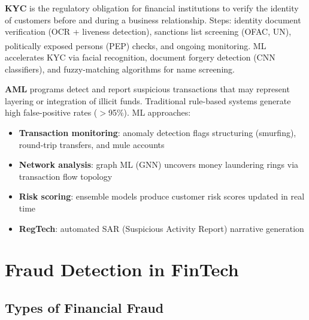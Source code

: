 \begin{tcbitemize}[ skin=sectionraster ]

    \tcbitem[title=Know Your Customer (KYC), raster multicolumn=3]
    \textbf{KYC} is the regulatory obligation for financial institutions to verify the identity of customers before and during a business relationship.
    Steps: identity document verification (OCR + liveness detection), sanctions list screening (OFAC, UN), politically exposed persons (PEP) checks, and ongoing monitoring\textsuperscript{\cite[][pp.~378--379]{kardellBuildFinancialSoftware2025}}.
    ML accelerates KYC via facial recognition, document forgery detection (CNN classifiers), and fuzzy-matching algorithms for name screening.

    \tcbitem[title=Anti-Money Laundering (AML), raster multicolumn=3]
    \textbf{AML} programs detect and report suspicious transactions that may represent layering or integration of illicit funds.
    Traditional rule-based systems generate high false-positive rates ($>$95\%).
    ML approaches:
    \tcblower
    \begin{itemize}
        \item \textbf{Transaction monitoring}: anomaly detection flags structuring (smurfing), round-trip transfers, and mule accounts
        \item \textbf{Network analysis}: graph ML (GNN) uncovers money laundering rings via transaction flow topology
        \item \textbf{Risk scoring}: ensemble models produce customer risk scores updated in real time
        \item \textbf{RegTech}: automated SAR (Suspicious Activity Report) narrative generation
    \end{itemize}

\end{tcbitemize}

\section{Fraud Detection in FinTech}

\subsection{Types of Financial Fraud}


